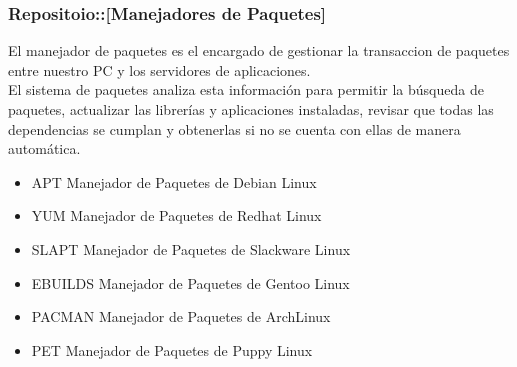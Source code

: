 \documentclass[xcolor=svgnames]{beamer}
\begin{document}

	\begin{frame}
	
		\frametitle{\textbf{Repositoio:}:[Manejadores de Paquetes]}
		
			El manejador de paquetes es el encargado de gestionar la transaccion de paquetes entre nuestro PC y los servidores de aplicaciones. \\		
			El sistema de paquetes analiza esta informaci\'on para permitir la b\'usqueda de paquetes, actualizar las librer\'ias y aplicaciones instaladas, revisar que todas las dependencias se cumplan y obtenerlas si no se cuenta con ellas de manera autom\'atica.
			
			\begin{itemize}{Los manejadores de paquetes mas usados:}
				\item APT Manejador de Paquetes de Debian Linux
				\item YUM Manejador de Paquetes de Redhat Linux
				\item SLAPT Manejador de Paquetes de Slackware Linux
				\item EBUILDS Manejador de Paquetes de Gentoo Linux
				\item PACMAN Manejador de Paquetes de ArchLinux
				\item PET Manejador de Paquetes de Puppy Linux
			\end{itemize}

	\end{frame}

\end{document}
